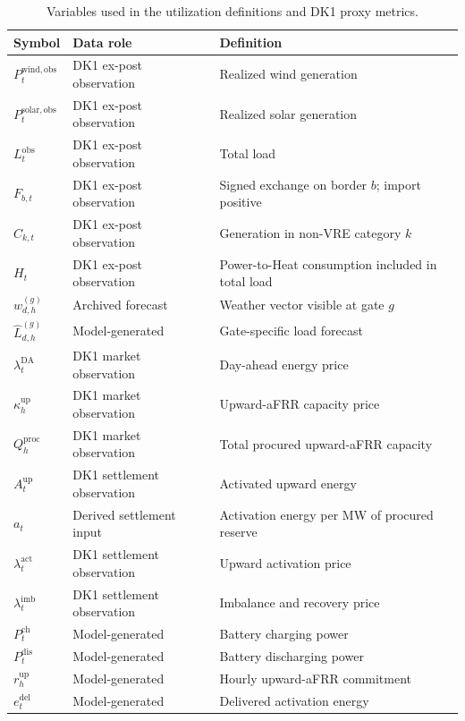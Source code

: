 \documentclass[11pt,a4paper]{article}
\begin{document}
\begin{table}[htbp]
  \centering
  \caption{Variables used in the utilization definitions and DK1 proxy metrics.}
  \begin{tabular}{lll}
    \toprule
    Symbol & Data role & Definition \\
    \midrule
    $P^{\mathrm{wind,obs}}_t$ & DK1 ex-post observation & Realized wind generation \\
    $P^{\mathrm{solar,obs}}_t$ & DK1 ex-post observation & Realized solar generation \\
    $L^{\mathrm{obs}}_t$ & DK1 ex-post observation & Total load \\
    $F_{b,t}$ & DK1 ex-post observation & Signed exchange on border $b$; import positive \\
    $C_{k,t}$ & DK1 ex-post observation & Generation in non-VRE category $k$ \\
    $H_t$ & DK1 ex-post observation & Power-to-Heat consumption included in total load \\
    $w^{(g)}_{d,h}$ & Archived forecast & Weather vector visible at gate $g$ \\
    $\widehat L^{(g)}_{d,h}$ & Model-generated & Gate-specific load forecast \\
    $\lambda^{\mathrm{DA}}_t$ & DK1 market observation & Day-ahead energy price \\
    $\kappa^{\mathrm{up}}_h$ & DK1 market observation & Upward-aFRR capacity price \\
    $Q^{\mathrm{proc}}_h$ & DK1 market observation & Total procured upward-aFRR capacity \\
    $A^{\mathrm{up}}_t$ & DK1 settlement observation & Activated upward energy \\
    $a_t$ & Derived settlement input & Activation energy per MW of procured reserve \\
    $\lambda^{\mathrm{act}}_t$ & DK1 settlement observation & Upward activation price \\
    $\lambda^{\mathrm{imb}}_t$ & DK1 settlement observation & Imbalance and recovery price \\
    $P^{\mathrm{ch}}_t$ & Model-generated & Battery charging power \\
    $P^{\mathrm{dis}}_t$ & Model-generated & Battery discharging power \\
    $r^{\mathrm{up}}_h$ & Model-generated & Hourly upward-aFRR commitment \\
    $e^{\mathrm{del}}_t$ & Model-generated & Delivered activation energy \\

\end{tabular}
\end{table}
\end{document}
